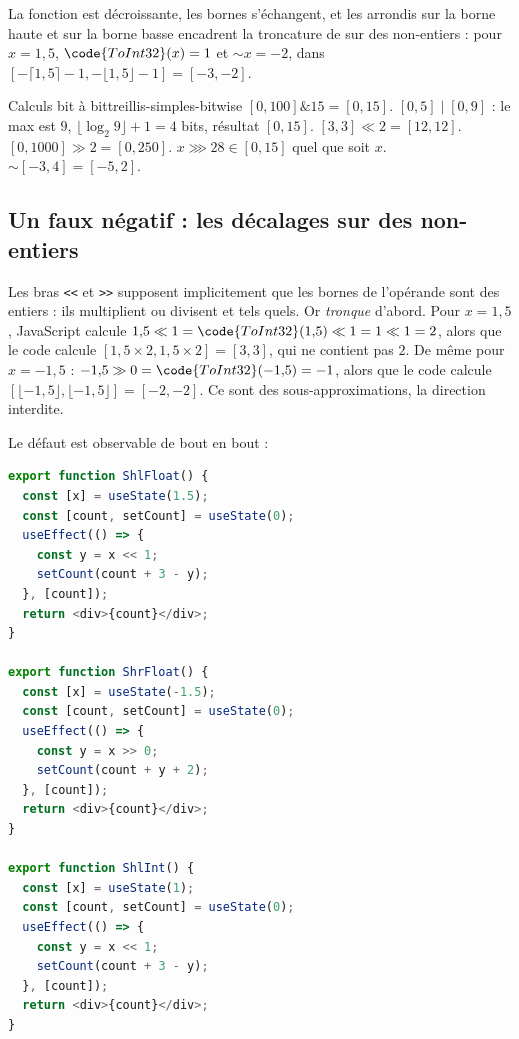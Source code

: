 La fonction est décroissante, les bornes s'échangent, et les arrondis
 sur la borne haute et  sur la borne basse encadrent
la troncature de  sur des non-entiers : pour $x = 1{,}5$,
$\code{ToInt32}(x) = 1$ et $\mathord{\sim} x = -2$, dans
$[-\lceil 1{,}5\rceil - 1, -\lfloor 1{,}5 \rfloor - 1] = [-3, -2]$.

\begin{exemple}{Calculs bit à bit}{treillis-simples-bitwise}
  $[0,100] \mathbin{\&} 15 = [0,15]$. $[0,5] \mathbin{|} [0,9]$ : le max est
  $9$, $\lfloor \log_2 9 \rfloor + 1 = 4$ bits, résultat $[0, 15]$.
  $[3,3] \ll 2 = [12,12]$. $[0,1000] \gg 2 = [0, 250]$.
  $x \ggg 28 \in [0, 15]$ quel que soit $x$.
  $\mathord{\sim}[-3,4] = [-5, 2]$.
\end{exemple}

\subsection{Un faux négatif : les décalages sur des non-entiers}

Les bras \texttt{<{}<} et \texttt{>{}>} supposent implicitement que les bornes de
l'opérande sont des entiers : ils multiplient ou divisent  et
 tels quels. Or  \emph{tronque} d'abord. Pour
$x = 1{,}5$, JavaScript calcule $1{,}5 \ll 1 = \code{ToInt32}(1{,}5) \ll 1 =
1 \ll 1 = 2$, alors que le code calcule $[1{,}5 \times 2, 1{,}5 \times 2] =
[3,3]$, qui ne contient pas $2$. De même pour $x = -1{,}5$ :
$-1{,}5 \gg 0 = \code{ToInt32}(-1{,}5) = -1$, alors que le code calcule
$[\lfloor -1{,}5 \rfloor, \lfloor -1{,}5 \rfloor] = [-2, -2]$. Ce sont des
sous-approximations, la direction interdite.

Le défaut est observable de bout en bout :

\begin{lstlisting}[language=TypeScript,caption={Décalages sur un état non entier (\file{/tmp/ch09/shift2.tsx}, élagué de sa ligne d'import)},label={lst:treillis-simples-shift}]
export function ShlFloat() {
  const [x] = useState(1.5);
  const [count, setCount] = useState(0);
  useEffect(() => {
    const y = x << 1;
    setCount(count + 3 - y);
  }, [count]);
  return <div>{count}</div>;
}

export function ShrFloat() {
  const [x] = useState(-1.5);
  const [count, setCount] = useState(0);
  useEffect(() => {
    const y = x >> 0;
    setCount(count + y + 2);
  }, [count]);
  return <div>{count}</div>;
}

export function ShlInt() {
  const [x] = useState(1);
  const [count, setCount] = useState(0);
  useEffect(() => {
    const y = x << 1;
    setCount(count + 3 - y);
  }, [count]);
  return <div>{count}</div>;
}
\end{lstlisting}

